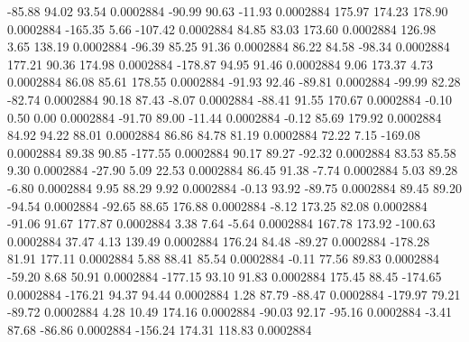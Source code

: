       -85.88       94.02       93.54     0.0002884
      -90.99       90.63      -11.93     0.0002884
      175.97      174.23      178.90     0.0002884
     -165.35        5.66     -107.42     0.0002884
       84.85       83.03      173.60     0.0002884
      126.98        3.65      138.19     0.0002884
      -96.39       85.25       91.36     0.0002884
       86.22       84.58      -98.34     0.0002884
      177.21       90.36      174.98     0.0002884
     -178.87       94.95       91.46     0.0002884
        9.06      173.37        4.73     0.0002884
       86.08       85.61      178.55     0.0002884
      -91.93       92.46      -89.81     0.0002884
      -99.99       82.28      -82.74     0.0002884
       90.18       87.43       -8.07     0.0002884
      -88.41       91.55      170.67     0.0002884
       -0.10        0.50        0.00     0.0002884
      -91.70       89.00      -11.44     0.0002884
       -0.12       85.69      179.92     0.0002884
       84.92       94.22       88.01     0.0002884
       86.86       84.78       81.19     0.0002884
       72.22        7.15     -169.08     0.0002884
       89.38       90.85     -177.55     0.0002884
       90.17       89.27      -92.32     0.0002884
       83.53       85.58        9.30     0.0002884
      -27.90        5.09       22.53     0.0002884
       86.45       91.38       -7.74     0.0002884
        5.03       89.28       -6.80     0.0002884
        9.95       88.29        9.92     0.0002884
       -0.13       93.92      -89.75     0.0002884
       89.45       89.20      -94.54     0.0002884
      -92.65       88.65      176.88     0.0002884
       -8.12      173.25       82.08     0.0002884
      -91.06       91.67      177.87     0.0002884
        3.38        7.64       -5.64     0.0002884
      167.78      173.92     -100.63     0.0002884
       37.47        4.13      139.49     0.0002884
      176.24       84.48      -89.27     0.0002884
     -178.28       81.91      177.11     0.0002884
        5.88       88.41       85.54     0.0002884
       -0.11       77.56       89.83     0.0002884
      -59.20        8.68       50.91     0.0002884
     -177.15       93.10       91.83     0.0002884
      175.45       88.45     -174.65     0.0002884
     -176.21       94.37       94.44     0.0002884
        1.28       87.79      -88.47     0.0002884
     -179.97       79.21      -89.72     0.0002884
        4.28       10.49      174.16     0.0002884
      -90.03       92.17      -95.16     0.0002884
       -3.41       87.68      -86.86     0.0002884
     -156.24      174.31      118.83     0.0002884

